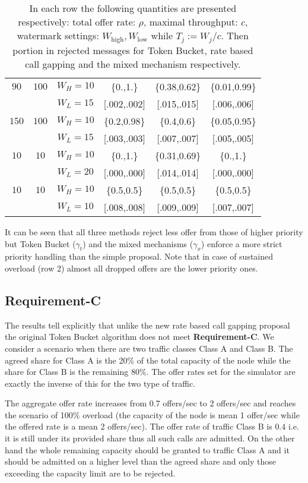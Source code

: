 \documentclass[conference]{IEEEtran}
\newcommand{\reqC}{\textbf{Requirement-C}}
\begin{document}
\begin{table}\label{table:reqB}
\center
\begin{tabular}{|c|c|c||c|c|c|}
\hline
$90$ & $100$ & $W_H=10$ & \{0.,1.\} & \{0.38,0.62\} & \{0.01,0.99\} \\
 &  & $W_L=15$ & [.002,.002] & [.015,.015] & [.006,.006] \\
\hline
$150$ & $100$ & $W_H=10$ & \{0.2,0.98\} & \{0.4,0.6\} & \{0.05,0.95\}\\
 &  & $W_L=15$ &  [.003,.003] & [.007,.007] & [.005,.005] \\
\hline
$10$ & $10$ & $W_H=10$ & \{0.,1.\} & \{0.31,0.69\} & \{0.,1.\}\\
 &  & $W_L=20$ & [.000,.000] & [.014,.014] & [.000,.000] \\
\hline
$10$ & $10$ & $W_H=10$ & \{0.5,0.5\} & \{0.5,0.5\} & \{0.5,0.5\}\\
 &  & $W_L=10$ & [.008,.008] & [.009,.009] & [.007,.007] \\
\hline
\end{tabular}
\caption{In each row the following quantities are presented
respectively: total offer rate: $\rho$, maximal throughput: $c$,
watermark settings: $W_{\mbox{high}},W_{\mbox{low}}$ while
$T_j:=W_j/c$. Then portion in rejected messages for Token Bucket,
rate based call gapping and the mixed mechanism respectively.}
\end{table}

It can be seen that all three methods reject less offer from those
of higher priority but Token Bucket ($\gamma_t$) and the mixed
mechanisms ($\gamma_x$) enforce a more strict priority handling than
the simple proposal. Note that in case of sustained overload (row 2)
almost all dropped offers are the lower priority ones.

\subsection{\reqC}
The results tell explicitly that unlike the new rate based call
gapping proposal the original Token Bucket algorithm does not meet
\reqC. We consider a scenario when there are two traffic classes
Class A and Class B. The agreed share for Class A is the 20\% of the
total capacity of the node while the share for Class B is the
remaining 80\%. The offer rates set for the simulator are exactly
the inverse of this for the two type of traffic.

The aggregate offer rate increases from 0.7 offers/sec to 2
offers/sec and reaches the scenario of 100\% overload (the capacity
of the node is mean 1 offer/sec while the offered rate is a mean 2
offers/sec). The offer rate of traffic Class B is $0.4$ i.e. it is
still under its provided share thus all such calls are admitted. On
the other hand the whole remaining capacity should be granted to
traffic Class A and it should be admitted on a higher level than the
agreed share and only those exceeding the capacity limit are to be
rejected.
\end{document}
